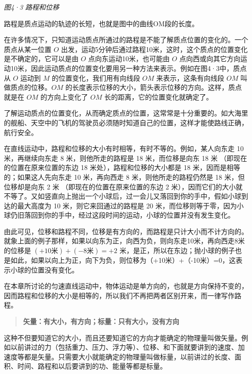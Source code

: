 \emph{图4·3 路程和位移}

路程是质点运动的轨迹的长短，也就是图中的曲线OM段的长度。

在许多情况下，只知道运动质点所通过的路程是不能了解质点位置的变化的。一个质点从某一位置
\(O\)
出发，运动5分钟后通过路程10米，这时，这个质点的位置变化是不确定的，它可以是由
\(O\) 点向东运动10米，也可能由 \(O\)
点向西或向其它方向运动10米，因此运动质点的位置变化要用另一种方法来表示。例如在图4·3中，质点从
\(O\) 运动到 \(M\) 的位置变化，我们用有向线段 \(OM\)
来表示，这条有向线段 \(OM\) 叫做质点的位移。\(OM\)
的长度表示位移的大小，箭头表示位移的方向。这样，质点就是在 \(OM\)
的方向上变化了 \(OM\) 长的距离，它的位置变化就确定了。

了解运动质点的位置变化，从而确定质点的位置，这常常是十分重要的。如大海里的舰船、天空中的飞机的驾驶员必须随时知道自己的位置，这样才能使路线正确，航行安全。

在直线运动中，路程和位移的大小有时相等，有时不等的。例如，某人向东走 10
米，再继续向东走 8 米，则他所走的路程是 18 米，而位移是向东 18 米
（即现在的位置在原来位置的东边 18 米处），路程和位移的大小都是 18
米，因而是相等的；如果这人先向东走 10 米，再向西走 8
米，则他所走的路程仍然是 18 米，但位移却是向东 2 米
（即现在的位置在原来位置的东边 2
米），因而它们的大小就不等了。又如竖直向上抛出一个小球后，过一会儿又落回到你的手中，假如小球到达的最大高度为
10 米，则它来回通过的路程是 20
米，而位移则等于零，因为小球仍旧落回到你的手中，经过这段时间的运动，小球的位置并没有发生变化。

由此可见，位移和路程不同，位移是有方向的，而路程是只计大小而不计方向的。就象上面的例子那样，如果以向东为正，向西为负，则向东走10米，再向西走8米的位移是
\((+10\text{米}) + (-8\text{米}) = +2\)
米，是正，所以在东边；抛小球的例子也是如此，如果以向上为正，向下为负，则位移为（+10米）+（-10米）=0，这表示小球的位置没有变化。

在本章所讨论的匀速直线运动中，物体运动是单方向的，也就是方向保持不变的，因而路程和位移的大小是相等的，所以我们不再把两者区别开来，而一律写作路程。

\begin{quote}
\textbf{矢量：有大小，有方向；标量：只有大小，没有方向}
\end{quote}

这种不但要知道它的大小，而且还要知道它的方向才能确定的物理量叫做矢量。例如以前讲过的力（包括重力、压力、浮力等）、位移、和下面就要讲到的速度、加速度等都是矢量。只需要大小就能确定的物理量叫做标量，以前讲过的长度、面积、时间、路程和以后要讲到的功、能量等都是标量。


